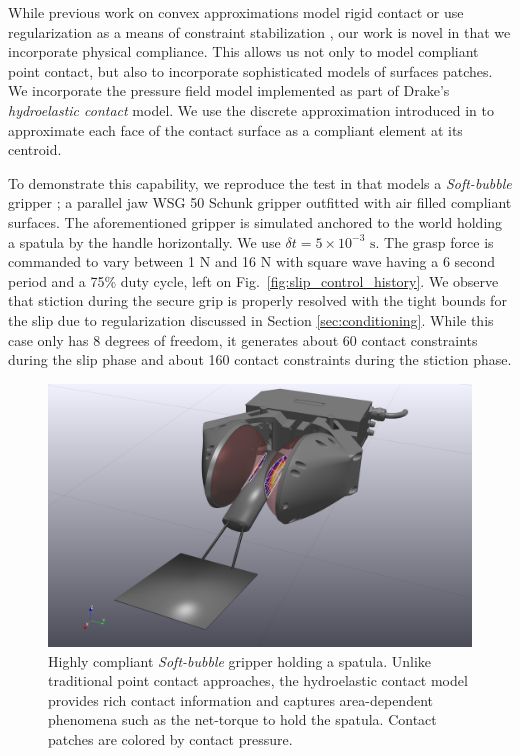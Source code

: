 While previous work on convex approximations model rigid contact
\cite{bib:anitescu2006,bib:mazhar2014} or use regularization as a means of
constraint stabilization \cite{bib:todorov2014}, our work is novel in that we
incorporate physical compliance. This allows us not only to model compliant
point contact, but also to incorporate sophisticated models of surfaces patches.
We incorporate the pressure field model \cite{bib:elandt2019pressure}
implemented as part of Drake's \cite{bib:drake} \emph{hydroelastic contact}
model. We use the discrete approximation introduced in
\cite{bib:masterjohn2021discrete} to approximate each face of the contact
surface as a compliant element at its centroid.

To demonstrate this capability, we reproduce the test in
\cite{bib:masterjohn2021discrete} that models a \emph{Soft-bubble} gripper
\cite{bib:kuppuswamy2020soft}; a parallel jaw WSG 50 Schunk gripper outfitted
with air filled compliant surfaces. The aforementioned gripper is simulated
anchored to the world holding a spatula by the handle horizontally. We use
$\delta t=5\times 10^{-3}\text{ s}$. The grasp force is commanded to vary
between 1 N and 16 N with square wave having a 6 second period and a 75\% duty
cycle, left on Fig.~\ref{fig:slip_control_history}.  We observe that stiction during the
secure grip is properly resolved with the tight bounds for the slip due to
regularization discussed in Section \ref{sec:conditioning}.
While this case only has 8 degrees of freedom, it generates about 60 contact
constraints during the slip phase and about 160 contact constraints during the
stiction phase.

\begin{figure}[!h]
	\centering
	\includegraphics[width=0.8\columnwidth]{figures/slip_control/slip_control_single_frame.png}
	\caption{\label{fig:slip_control_frame} 
	Highly compliant \emph{Soft-bubble} gripper \cite{bib:kuppuswamy2020soft}
	holding a spatula. Unlike traditional point contact approaches, the
	hydroelastic contact model provides rich contact information and captures
	area-dependent phenomena such as the net-torque to hold the spatula. Contact
	patches are colored by contact pressure.}
\end{figure}

